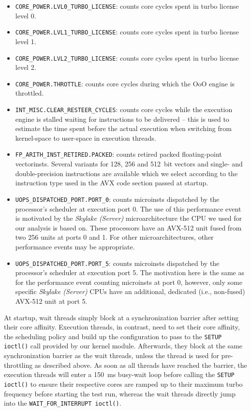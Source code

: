 \begin{itemize}
	\item \texttt{CORE\_POWER.LVL0\_TURBO\_LICENSE}: counts core cycles spent in turbo license level 0.
	\item \texttt{CORE\_POWER.LVL1\_TURBO\_LICENSE}: counts core cycles spent in turbo license level 1.
	\item \texttt{CORE\_POWER.LVL2\_TURBO\_LICENSE}: counts core cycles spent in turbo license level 2.
	\item \texttt{CORE\_POWER.THROTTLE}: counts core cycles during which the \gls{OoO} engine is throttled.
	\item \texttt{INT\_MISC.CLEAR\_RESTEER\_CYCLES}: counts core cycles while the execution engine is stalled waiting for instructions to be delivered -- this is used to estimate the time spent before the actual execution when switching from kernel-space to user-space in execution threads.
	\item \texttt{FP\_ARITH\_INST\_RETIRED.PACKED}: counts retired packed floating-point \glspl{vectorinst}. Several variants for \SI{128}{\bit}, \SI{256}{\bit} and \SI{512}{bit} vectors and single- and double-precision instructions are available which we select according to the instruction type used in the \gls{AVX} code section passed at startup.
	\item \texttt{UOPS\_DISPATCHED\_PORT.PORT\_0}: counts \glspl{microinst} dispatched by the processor's scheduler at execution port 0. The use of this performance event is motivated by the \textit{Skylake (Server)} microarchitecture the \gls{CPU} we used for our analysis is based on. These processors have \cite{intelxeonscalabledeepdive} an \gls{AVX-512} unit fused from two \SI{256}{\bit} units at ports 0 and 1. For other microarchitectures, other performance events may be appropriate.
	\item \texttt{UOPS\_DISPATCHED\_PORT.PORT\_5}: counts \glspl{microinst} dispatched by the processor's scheduler at execution port 5. The motivation here is the same as for the performance event counting \glspl{microinst} at port 0, however, only some specific \textit{Skylake (Server)} \glspl{CPU} have an additional, dedicated (i.e., non-fused) \gls{AVX-512} unit at port 5.
\end{itemize}

At startup, wait threads simply block at a synchronization barrier after setting their core affinity. Execution threads, in contrast, need to set their core affinity, the scheduling policy and build up the configuration to pass to the \texttt{SETUP ioctl()} call provided by our kernel module. Afterwards, they block at the same synchronization barrier as the wait threads, unless the thread is used for pre-throttling as described above. As soon as all threads have reached the barrier, the execution threads will enter a \SI{150}{\milli\second} busy-wait loop before calling the \texttt{SETUP ioctl()} to ensure their respective cores are ramped up to their maximum turbo frequency before starting the test run, whereas the wait threads directly jump into the \texttt{WAIT\_FOR\_INTERRUPT ioctl()}.

